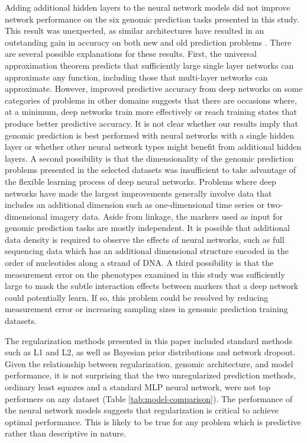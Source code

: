 Adding additional hidden layers to the neural network models did not improve
network performance on the six genomic prediction tasks presented in this study.
This result was unexpected, as similar architectures have resulted in an outstanding 
gain in accuracy on both new and old prediction problems \citep{subasi2005, lang1990, mnih2013}.
There are several possible explanations for these results. First, the universal
approximation theorem predicts that sufficiently large single layer networks
can approximate any function, including those that multi-layer networks can approximate.
However, improved predictive accuracy from deep networks on some categories of problems
in other domains suggests that there are occasions where, 
at a minimum, deep networks train more effectively or reach training states that 
produce better predictive accuracy. It is not clear whether our results imply that
genomic prediction is best performed with neural networks with a single hidden 
layer or whether other neural network types might benefit from additional hidden layers.
A second possibility is that the dimensionality of the genomic prediction problems
presented in the selected datasets was insufficient to take advantage of the
flexible learning process of deep neural networks. Problems where deep networks have
made the largest improvements generally involve data that includes an additional dimension
such as one-dimensional time series or two-dimensional imagery data. Aside from linkage, the markers used as 
input for genomic prediction tasks are mostly independent. It is possible that 
additional data density is required to observe the effects of neural networks, 
such as full sequencing data which has an additional dimensional structure encoded 
in the order of nucleotides along a strand of DNA. A third possibility is that 
the measurement error on the phenotypes examined in this study was sufficiently 
large to mask the subtle interaction effects between markers that a deep 
network could potentially learn. If so, this problem could be resolved by reducing 
measurement error or increasing sampling sizes in genomic prediction training datasets.  

The regularization methods presented in this paper included standard methods such 
as L1 and L2, as well as Bayesian prior distributions and network dropout. 
Given the relationship between regularization, genomic architecture, and model 
performance, it is not surprising that the two unregularized prediction methods, 
ordinary least squares and a standard MLP neural network, were not top performers 
on any dataset (Table \ref{tab:model-comparison}). The performance of the neural 
network models suggests that regularization is critical to achieve optimal 
performance. This is likely to be true for any problem which is predictive rather 
than descriptive in nature.

